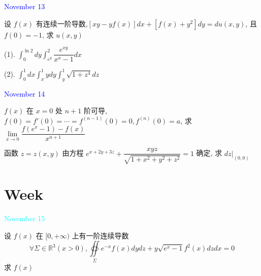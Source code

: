 \textcolor{blue}{November 13}

\begin{example}[][Exam: 37.2.11]
	设 $f(x)$ 有连续一阶导数,$[xy-yf(x)]dx+[f(x)+y^2]dy=du(x,y)$, 且 $f(0)=-1$, 求 $u(x,y)$
\end{example}

\begin{solution}
	
\end{solution}

\begin{example}[][Exam: 37.2.12]
	(1). $\displaystyle{\int_{0}^{\ln 2}dy\int_{e^{y}}^{2}\dfrac{e^{xy}}{x^{x}-1}dx}$

	(2). $\displaystyle{\int_{0}^{1}dx\int_{x}^{1}ydy\int_{y}^{1}\sqrt{1+z^4}dz}$
\end{example}
\begin{solution}
	
\end{solution}


\textcolor{blue}{November 14}

\begin{example}[][Exam: 37.2.13]
	$f(x)$ 在 $x=0$ 处 $n+1$ 阶可导, $f(0)=f'(0)=\cdots=f^{(n-1)}(0)=0, f^{(n)}(0)=a$,
	求 $\lim\limits_{x\to 0}\dfrac{f(e^{x}-1)-f(x)}{x^{n+1}}$
\end{example}

\begin{solution}
	
\end{solution}

\begin{example}[][Exam: 37.2.14]
	函数 $z=z(x,y)$ 由方程 $\displaystyle{e^{x+2y+3z}+\dfrac{xyz}{\sqrt{1+x^2+y^2+z^2}}=1}$ 确定, 求 $dz\big|_{(0,0)}$
\end{example}

\begin{solution}
	
\end{solution}


\section{Week }
\textcolor{cyan}{November 15}

\begin{example}[][Exam: 37.3.1]
	设 $f(x)$ 在 $[0,+\infty)$ 上有一阶连续导数 
	$$\forall \varSigma\in \mathbb{R}^{3}(x>0), \oiint\limits_{\varSigma}e^{-x}f(x)dydz+y\sqrt{e^{x}-1}f^{2}(x)dzdx=0$$
	求 $f(x)$
\end{example}

